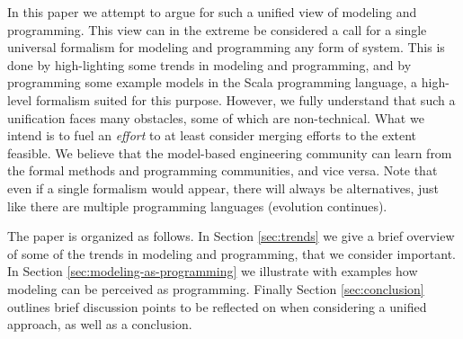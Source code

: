 In this paper we attempt to argue for such a unified view 
of modeling and programming. This view can in the extreme be 
considered a call
for a single universal formalism for modeling and programming any
form of system. This is done by high-lighting some trends in 
modeling and programming, and by programming some example
models in the Scala programming language, a high-level formalism
suited for this purpose.
However, we fully understand that such a unification faces many
obstacles, some of which are non-technical. 
What we intend is to fuel an {\em effort} to at least consider
merging efforts to the extent feasible. We believe that the model-based
engineering community can learn from the formal methods and 
programming communities, and vice versa. Note that even if a single
formalism would appear, there will always be alternatives, just like
there are multiple programming languages (evolution continues). 

The paper is organized as follows.
In Section \ref{sec:trends} we give a brief overview of some 
of the trends in modeling and programming, that we consider important. 
In Section \ref{sec:modeling-as-programming} we illustrate with examples how modeling can be perceived as programming. 
Finally Section \ref{sec:conclusion} outlines
brief discussion points to be reflected on
when considering a unified approach, as well
as a conclusion.
